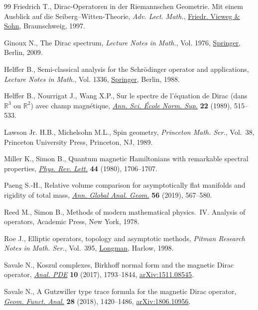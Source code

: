 \documentclass[10pt,a4paper]{amsart}
\numberwithin{equation}{section}
\begin{document}
\begin{thebibliography}{99}
Friedrich T., Dirac-{O}peratoren in der {R}iemannschen {G}eometrie. {M}it einem
 {A}usblick auf die {S}eiberg--{W}itten-{T}heorie, \textit{Adv. Lect. Math.}, \href{https://doi.org/10.1007/978-3-322-80302-3}{Friedr.
 Vieweg \& Sohn}, Braunschweig, 1997.

Ginoux N., The {D}irac spectrum, \textit{Lecture Notes in Math.}, Vol. 1976,
 \href{https://doi.org/10.1007/978-3-642-01570-0}{Springer}, Berlin, 2009.

Helffer B., Semi-classical analysis for the {S}chr\"odinger operator and
 applications, \textit{Lecture Notes in Math.}, Vol. 1336, \href{https://doi.org/10.1007/BFb0078115}{Springer}, Berlin,
 1988.

Helffer B., Nourrigat J., Wang X.P., Sur le spectre de l'\'equation de {D}irac
 (dans {${\mathbb R}^3$} ou {${\mathbb R}^2$}) avec champ magn\'etique,
 \href{https://doi.org/10.24033/asens.1591}{\textit{Ann. Sci. \'Ecole Norm. Sup.}} \textbf{22} (1989), 515--533.

Lawson Jr. H.B., Michelsohn M.L., Spin geometry, \textit{Princeton Math. Ser.},
 Vol.~38, Princeton University Press, Princeton, NJ, 1989.

Miller K., Simon B., Quantum magnetic {H}amiltonians with remarkable spectral
 properties, \href{https://doi.org/10.1103/PhysRevLett.44.1706}{\textit{Phys. Rev. Lett.}} \textbf{44} (1980), 1706--1707.

Paeng S.-H., Relative volume comparison for asymptotically flat manifolds and
 rigidity of total mass, \href{https://doi.org/10.1007/s10455-019-09679-4}{\textit{Ann. Global Anal. Geom.}} \textbf{56} (2019),
 567--580.

Reed M., Simon B., Methods of modern mathematical physics.~{IV}. {A}nalysis of
 operators, Academic Press, New York, 1978.

Roe J., Elliptic operators, topology and asymptotic methods, \textit{Pitman
 Research Notes in Math. Ser.}, Vol.~395, \href{https://doi.org/10.1201/b16418}{Longman}, Harlow, 1998.

Savale N., Koszul complexes, {B}irkhoff normal form and the magnetic {D}irac
 operator, \href{https://doi.org/10.2140/apde.2017.10.1793}{\textit{Anal. PDE}} \textbf{10} (2017), 1793--1844,
 \href{https://arxiv.org/abs/1511.08545}{arXiv:1511.08545}.

Savale N., A {G}utzwiller type trace formula for the magnetic {D}irac operator,
 \href{https://doi.org/10.1007/s00039-018-0462-y}{\textit{Geom. Funct. Anal.}} \textbf{28} (2018), 1420--1486,
 \href{https://arxiv.org/abs/1806.10956}{arXiv:1806.10956}.


\end{thebibliography}
\end{document}
